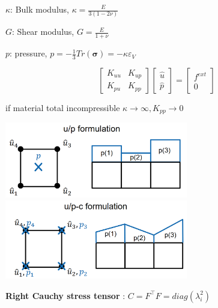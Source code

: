 \documentclass[landscape,a0paper,fontscale=0.285]{baposter} %
\begin{document}
\begin{poster}
{$\kappa$: Bulk modulus, $\kappa = \frac{E}{3(1-2\nu)}$

$G$: Shear modulus, $G=\frac{E}{1+\nu}$

$p$: pressure, $p = -\frac{1}{3}Tr(\boldsymbol\sigma) = -\kappa \varepsilon_V$

$$
\left[\begin{smallmatrix}
    K_{uu} & K_{up}\\
    K_{pu} & K_{pp}
\end{smallmatrix}\right]
\left[\begin{smallmatrix}
    \hat u \\ \hat p
\end{smallmatrix}\right] = 
\left[\begin{smallmatrix}
    f^{ext}\\0
\end{smallmatrix}\right]
$$

if material total incompressible $\kappa\rightarrow \infty, K_{pp}\rightarrow 0 $

\colorbox[HTML]{CCFFFF}{}
\vspace{-0.5cm}
\begin{center}
\includegraphics[width=0.6\textwidth, trim={0 0.2cm 0 0.2cm},clip]{figures/ETHz_AFEA_FEM_Hyper_Elastic_mixed_formulation_a.png}
\includegraphics[width=0.6\textwidth, trim={0 0.2cm 0 0.2cm},clip]{figures/ETHz_AFEA_FEM_Hyper_Elastic_mixed_formulation_b.png}
\end{center}
\vspace{-0.2cm}
\textbf{Right Cauchy stress tensor} : $C = F^\top F = diag(\lambda_i^2)$\vspace{-0.3cm}

}
\end{poster}
\end{document}
